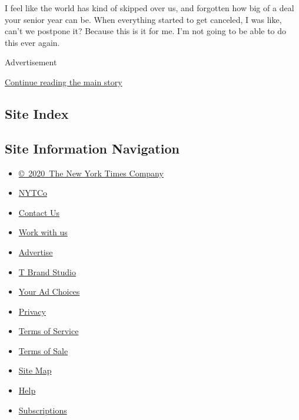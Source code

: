 I feel like the world has kind of skipped over us, and forgotten how big
of a deal your senior year can be. When everything started to get
canceled, I was like, can't we postpone it? Because this is it for me.
I'm not going to be able to do this ever again.

Advertisement

\protect\hyperlink{after-bottom}{Continue reading the main story}

\hypertarget{site-index}{%
\subsection{Site Index}\label{site-index}}

\hypertarget{site-information-navigation}{%
\subsection{Site Information
Navigation}\label{site-information-navigation}}

\begin{itemize}
\tightlist
\item
  \href{https://help.nytimes3xbfgragh.onion/hc/en-us/articles/115014792127-Copyright-notice}{©~2020~The
  New York Times Company}
\end{itemize}

\begin{itemize}
\tightlist
\item
  \href{https://www.nytco.com/}{NYTCo}
\item
  \href{https://help.nytimes3xbfgragh.onion/hc/en-us/articles/115015385887-Contact-Us}{Contact
  Us}
\item
  \href{https://www.nytco.com/careers/}{Work with us}
\item
  \href{https://nytmediakit.com/}{Advertise}
\item
  \href{http://www.tbrandstudio.com/}{T Brand Studio}
\item
  \href{https://www.nytimes3xbfgragh.onion/privacy/cookie-policy\#how-do-i-manage-trackers}{Your
  Ad Choices}
\item
  \href{https://www.nytimes3xbfgragh.onion/privacy}{Privacy}
\item
  \href{https://help.nytimes3xbfgragh.onion/hc/en-us/articles/115014893428-Terms-of-service}{Terms
  of Service}
\item
  \href{https://help.nytimes3xbfgragh.onion/hc/en-us/articles/115014893968-Terms-of-sale}{Terms
  of Sale}
\item
  \href{https://spiderbites.nytimes3xbfgragh.onion}{Site Map}
\item
  \href{https://help.nytimes3xbfgragh.onion/hc/en-us}{Help}
\item
  \href{https://www.nytimes3xbfgragh.onion/subscription?campaignId=37WXW}{Subscriptions}
\end{itemize}
